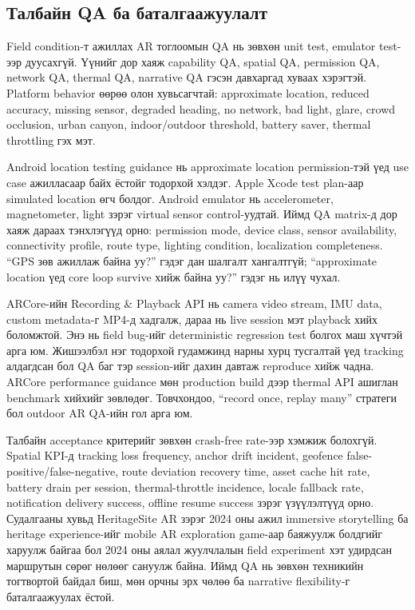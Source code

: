 \begin{sloppy}
\section*{Талбайн QA ба баталгаажуулалт}

Field condition-т ажиллах AR тоглоомын QA нь зөвхөн unit test, emulator test-ээр дуусахгүй. Үүнийг дор хаяж capability QA, spatial QA, permission QA, network QA, thermal QA, narrative QA гэсэн давхаргад хуваах хэрэгтэй. Platform behavior өөрөө олон хувьсагчтай: approximate location, reduced accuracy, missing sensor, degraded heading, no network, bad light, glare, crowd occlusion, urban canyon, indoor/outdoor threshold, battery saver, thermal throttling гэх мэт.

Android location testing guidance нь approximate location permission-тэй үед use case ажилласаар байх ёстойг тодорхой хэлдэг. Apple Xcode test plan-аар simulated location өгч болдог. Android emulator нь accelerometer, magnetometer, light зэрэг virtual sensor control-уудтай. Иймд QA matrix-д дор хаяж дараах тэнхлэгүүд орно: permission mode, device class, sensor availability, connectivity profile, route type, lighting condition, localization completeness. ``GPS зөв ажиллаж байна уу?'' гэдэг дан шалгалт хангалтгүй; ``approximate location үед core loop survive хийж байна уу?'' гэдэг нь илүү чухал.

ARCore-ийн Recording \& Playback API нь camera video stream, IMU data, custom metadata-г MP4-д хадгалж, дараа нь live session мэт playback хийх боломжтой. Энэ нь field bug-ийг deterministic regression test болгох маш хүчтэй арга юм. Жишээлбэл нэг тодорхой гудамжинд нарны хурц тусгалтай үед tracking алдагдсан бол QA баг тэр session-ийг дахин давтаж reproduce хийж чадна. ARCore performance guidance мөн production build дээр thermal API ашиглан benchmark хийхийг зөвлөдөг. Товчхондоо, ``record once, replay many'' стратеги бол outdoor AR QA-ийн гол арга юм.

Талбайн acceptance критерийг зөвхөн crash-free rate-ээр хэмжиж болохгүй. Spatial KPI-д tracking loss frequency, anchor drift incident, geofence false-positive/false-negative, route deviation recovery time, asset cache hit rate, battery drain per session, thermal-throttle incidence, locale fallback rate, notification delivery success, offline resume success зэрэг үзүүлэлтүүд орно. Судалгааны хувьд HeritageSite AR зэрэг 2024 оны ажил immersive storytelling ба heritage experience-ийг mobile AR exploration game-аар баяжуулж болдгийг харуулж байгаа бол 2024 оны аялал жуулчлалын field experiment хэт удирдсан маршрутын сөрөг нөлөөг сануулж байна. Иймд QA нь зөвхөн техникийн тогтвортой байдал биш, мөн орчны эрх чөлөө ба narrative flexibility-г баталгаажуулах ёстой.


\end{sloppy}
